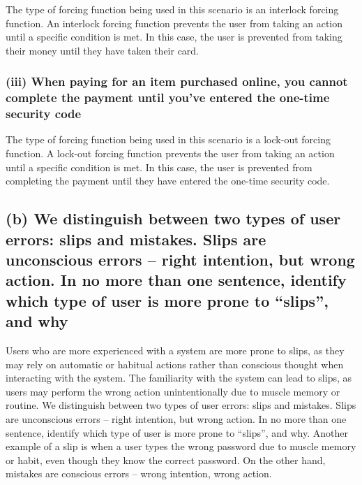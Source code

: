 \documentclass{article}
\begin{document}
The type of forcing function being used in this scenario is an interlock forcing function.
An interlock forcing function prevents the user from taking an action until a specific condition is met.
In this case, the user is prevented from taking their money until they have taken their card.

\subsubsection{(iii) When paying for an item purchased online, you cannot complete the
    payment until you’ve entered the one-time security code}

The type of forcing function being used in this scenario is a lock-out forcing function.
A lock-out forcing function prevents the user from taking an action until a specific condition is met.
In this case, the user is prevented from completing the payment until they have entered the one-time security code.

\subsection{(b) We distinguish between two types of user errors: slips and mistakes. Slips
    are unconscious errors – right intention, but wrong action.
    In no more than one sentence, identify which type of user is more prone to
    “slips”, and why}

Users who are more experienced with a system are more prone to slips, as they may rely on automatic or habitual actions rather than conscious thought when interacting with the system.
The familiarity with the system can lead to slips, as users may perform the wrong action unintentionally due to muscle memory or routine.
We distinguish between two types of user errors: slips and mistakes. Slips are unconscious errors – right intention, but wrong action.
In no more than one sentence, identify which type of user is more prone to “slips”, and why.
Another example of a slip is when a user types the wrong password due to muscle memory or habit, even though they know the correct password.
On the other hand, mistakes are conscious errors – wrong intention, wrong action.
\end{document}
